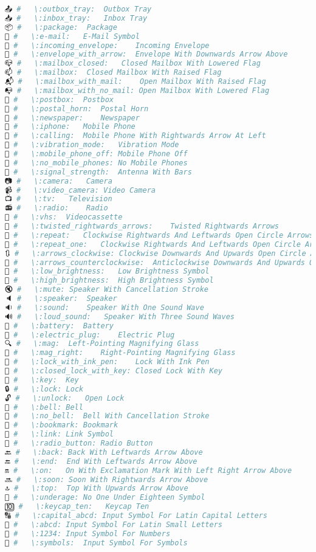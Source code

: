 \begin{lstlisting}[language=Julia]
📤 #   \:outbox_tray:  Outbox Tray
📥 #   \:inbox_tray:   Inbox Tray
📦 #   \:package:  Package
📧 #   \:e-mail:   E-Mail Symbol
📨 #   \:incoming_envelope:    Incoming Envelope
📩 #   \:envelope_with_arrow:  Envelope With Downwards Arrow Above
📪 #   \:mailbox_closed:   Closed Mailbox With Lowered Flag
📫 #   \:mailbox:  Closed Mailbox With Raised Flag
📬 #   \:mailbox_with_mail:    Open Mailbox With Raised Flag
📭 #   \:mailbox_with_no_mail: Open Mailbox With Lowered Flag
📮 #   \:postbox:  Postbox
📯 #   \:postal_horn:  Postal Horn
📰 #   \:newspaper:    Newspaper
📱 #   \:iphone:   Mobile Phone
📲 #   \:calling:  Mobile Phone With Rightwards Arrow At Left
📳 #   \:vibration_mode:   Vibration Mode
📴 #   \:mobile_phone_off: Mobile Phone Off
📵 #   \:no_mobile_phones: No Mobile Phones
📶 #   \:signal_strength:  Antenna With Bars
📷 #   \:camera:   Camera
📹 #   \:video_camera: Video Camera
📺 #   \:tv:   Television
📻 #   \:radio:    Radio
📼 #   \:vhs:  Videocassette
🔀 #   \:twisted_rightwards_arrows:    Twisted Rightwards Arrows
🔁 #   \:repeat:   Clockwise Rightwards And Leftwards Open Circle Arrows
🔂 #   \:repeat_one:   Clockwise Rightwards And Leftwards Open Circle Arrows, Circled One
🔃 #   \:arrows_clockwise: Clockwise Downwards And Upwards Open Circle Arrows
🔄 #   \:arrows_counterclockwise:  Anticlockwise Downwards And Upwards Open Circle Arrows
🔅 #   \:low_brightness:   Low Brightness Symbol
🔆 #   \:high_brightness:  High Brightness Symbol
🔇 #   \:mute: Speaker With Cancellation Stroke
🔈 #   \:speaker:  Speaker
🔉 #   \:sound:    Speaker With One Sound Wave
🔊 #   \:loud_sound:   Speaker With Three Sound Waves
🔋 #   \:battery:  Battery
🔌 #   \:electric_plug:    Electric Plug
🔍 #   \:mag:  Left-Pointing Magnifying Glass
🔎 #   \:mag_right:    Right-Pointing Magnifying Glass
🔏 #   \:lock_with_ink_pen:    Lock With Ink Pen
🔐 #   \:closed_lock_with_key: Closed Lock With Key
🔑 #   \:key:  Key
🔒 #   \:lock: Lock
🔓 #   \:unlock:   Open Lock
🔔 #   \:bell: Bell
🔕 #   \:no_bell:  Bell With Cancellation Stroke
🔖 #   \:bookmark: Bookmark
🔗 #   \:link: Link Symbol
🔘 #   \:radio_button: Radio Button
🔙 #   \:back: Back With Leftwards Arrow Above
🔚 #   \:end:  End With Leftwards Arrow Above
🔛 #   \:on:   On With Exclamation Mark With Left Right Arrow Above
🔜 #   \:soon: Soon With Rightwards Arrow Above
🔝 #   \:top:  Top With Upwards Arrow Above
🔞 #   \:underage: No One Under Eighteen Symbol
🔟 #   \:keycap_ten:   Keycap Ten
🔠 #   \:capital_abcd: Input Symbol For Latin Capital Letters
🔡 #   \:abcd: Input Symbol For Latin Small Letters
🔢 #   \:1234: Input Symbol For Numbers
🔣 #   \:symbols:  Input Symbol For Symbols

\end{lstlisting}

